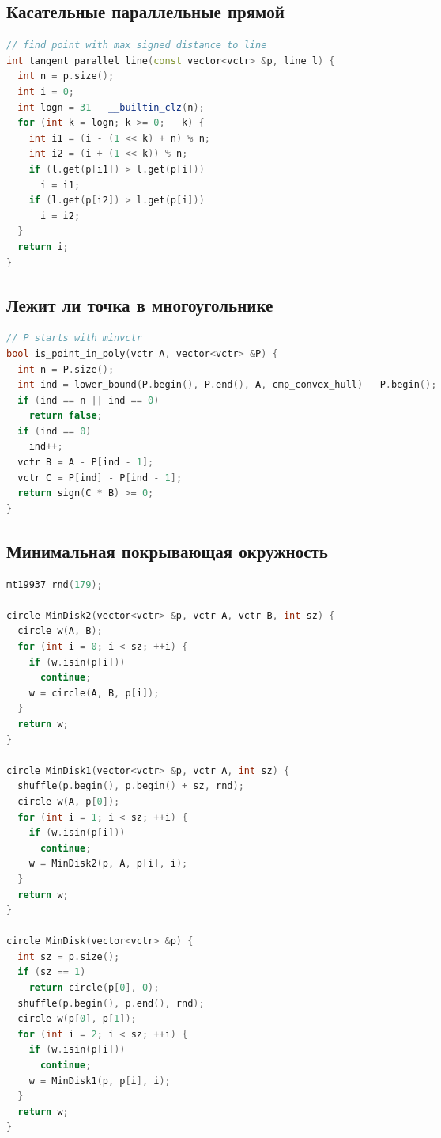 \documentclass[10pt,a4paper,landscape,twosided]{extarticle}
\begin{document}
\begin{multicols*}{3}
\subsection{Касательные параллельные прямой}
\begin{lstlisting}[language=C++]
// find point with max signed distance to line
int tangent_parallel_line(const vector<vctr> &p, line l) {
  int n = p.size();
  int i = 0;
  int logn = 31 - __builtin_clz(n);
  for (int k = logn; k >= 0; --k) {
    int i1 = (i - (1 << k) + n) % n;
    int i2 = (i + (1 << k)) % n;
    if (l.get(p[i1]) > l.get(p[i]))
      i = i1;
    if (l.get(p[i2]) > l.get(p[i]))
      i = i2;
  }
  return i;
}

\end{lstlisting}

\subsection{Лежит ли точка в многоугольнике}
\begin{lstlisting}[language=C++]
// P starts with minvctr
bool is_point_in_poly(vctr A, vector<vctr> &P) {
  int n = P.size();
  int ind = lower_bound(P.begin(), P.end(), A, cmp_convex_hull) - P.begin();
  if (ind == n || ind == 0)
    return false;
  if (ind == 0)
    ind++;
  vctr B = A - P[ind - 1];
  vctr C = P[ind] - P[ind - 1];
  return sign(C * B) >= 0;
}

\end{lstlisting}

\subsection{Минимальная покрывающая окружность}
\begin{lstlisting}[language=C++]
mt19937 rnd(179);

circle MinDisk2(vector<vctr> &p, vctr A, vctr B, int sz) {
  circle w(A, B);
  for (int i = 0; i < sz; ++i) {
    if (w.isin(p[i]))
      continue;
    w = circle(A, B, p[i]);
  }
  return w;
}

circle MinDisk1(vector<vctr> &p, vctr A, int sz) {
  shuffle(p.begin(), p.begin() + sz, rnd);
  circle w(A, p[0]);
  for (int i = 1; i < sz; ++i) {
    if (w.isin(p[i]))
      continue;
    w = MinDisk2(p, A, p[i], i);
  }
  return w;
}

circle MinDisk(vector<vctr> &p) {
  int sz = p.size();
  if (sz == 1)
    return circle(p[0], 0);
  shuffle(p.begin(), p.end(), rnd);
  circle w(p[0], p[1]);
  for (int i = 2; i < sz; ++i) {
    if (w.isin(p[i]))
      continue;
    w = MinDisk1(p, p[i], i);
  }
  return w;
}


\end{lstlisting}
\end{multicols*}
\end{document}
